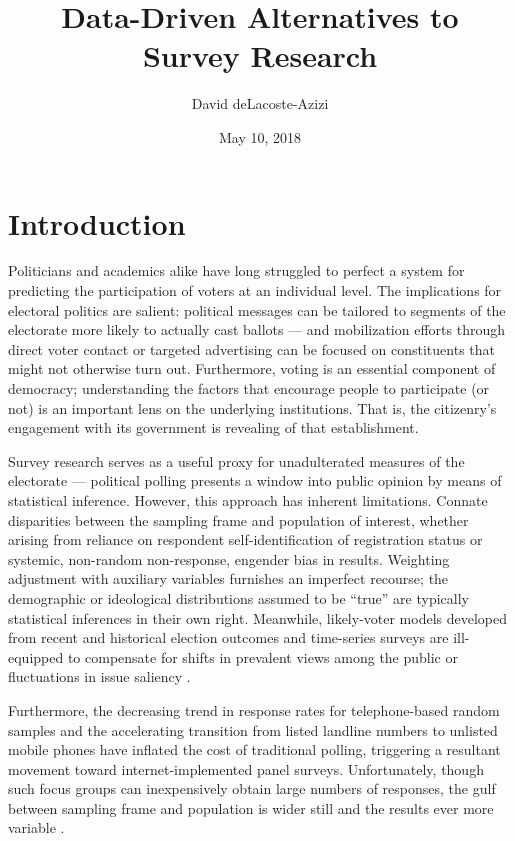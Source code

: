 \documentclass[12pt]{article}
\title{Data-Driven Alternatives to Survey Research}
\author{David deLacoste-Azizi}
\date{May 10, 2018}
\begin{document}
\maketitle

\tableofcontents
 
\listoftables

\listoffigures

\section{Introduction}

Politicians and academics alike have long struggled to perfect a system for predicting the participation of voters at an individual level. The implications for electoral politics are salient: political messages can be tailored to segments of the electorate more likely to actually cast ballots --- and mobilization efforts through direct voter contact or targeted advertising can be focused on constituents that might not otherwise turn out. Furthermore, voting is an essential component of democracy; understanding the factors that encourage people to participate (or not) is an important lens on the underlying institutions. That is, the citizenry's engagement with its government is revealing of that establishment.

Survey research serves as a useful proxy for unadulterated measures of the electorate --- political polling presents a window into public opinion by means of statistical inference. However, this approach has inherent limitations. Connate disparities between the sampling frame and population of interest, whether arising from reliance on respondent self-identification of registration status or systemic, non-random non-response, engender bias in results. Weighting adjustment with auxiliary variables furnishes an imperfect recourse; the demographic or ideological distributions assumed to be ``true'' are typically statistical inferences in their own right. Meanwhile, likely-voter models developed from recent and historical election outcomes and time-series surveys are ill-equipped to compensate for shifts in prevalent views among the public or fluctuations in issue saliency \cite{Traugott:2003aa, Mann:2003aa}.

Furthermore, the decreasing trend in response rates for telephone-based random samples and the accelerating transition from listed landline numbers to unlisted mobile phones have inflated the cost of traditional polling, triggering a resultant movement toward internet-implemented panel surveys. Unfortunately, though such focus groups can inexpensively obtain large numbers of responses, the gulf between sampling frame and population is wider still and the results ever more variable \cite{Zukin:2015aa}.
\end{document}
